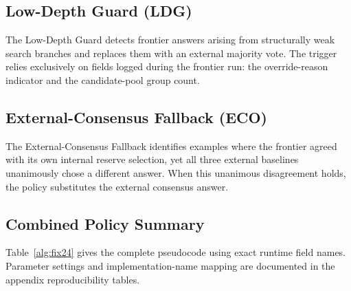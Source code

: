 \subsection{Low-Depth Guard (LDG)}
\label{sec:fix2}

The Low-Depth Guard detects frontier answers arising from structurally weak
search branches and replaces them with an external majority vote.
The trigger relies exclusively on fields logged during the frontier run:
the override-reason indicator and the candidate-pool group count.

\subsection{External-Consensus Fallback (ECO)}
\label{sec:fix4}

The External-Consensus Fallback identifies examples where the frontier agreed
with its own internal reserve selection, yet all three external baselines
unanimously chose a different answer.
When this unanimous disagreement holds, the policy substitutes the external
consensus answer.

\subsection{Combined Policy Summary}
\label{sec:fix24_algorithm}

Table~\ref{alg:fix24} gives the complete pseudocode using exact runtime field
names.
Parameter settings and implementation-name mapping are documented in the
appendix reproducibility tables.

